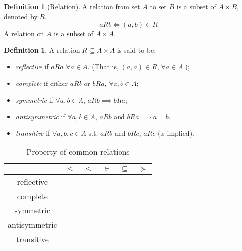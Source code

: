 \documentclass[12pt]{article}
\theoremstyle{definition}
\newtheorem{definition}[theorem]{Definition}
\theoremstyle{plain}
\newcommand{\cmark}{\ding{51}}%
\newcommand{\xmark}{\ding{55}}%
\begin{document}
\begin{definition}
    [Relation]
    A relation from set $A$ to set $B$ is a subset of $A\times B$, denoted by 
    $R$. 
    \[
        a R b \iff (a,b) \in R
    \]
    A relation on $A$ is a subset of $A \times A$.

    \label{def:a_relation_on_A}
\end{definition}

\begin{definition}
    A relation $R \subseteq A \times A$ is said to be: 
    \begin{itemize}
        \item \emph{reflective} if $a R a$ $\forall a \in A$. (That is, $(a,a) \in R 
            $, $\forall a \in A$.);

        \item \emph{complete} if either $aRb$ or $b R a$, $\forall a, b \in A$;

        \item \emph{symmetric} if $\forall a, b \in A$, $aR b \implies b R a$;

        \item \emph{antisymmetric} if $\forall a, b \in A$, $a R b $ and $ b R a 
            \implies a = b$.

        \item \emph{transitive} if $\forall a,b,c \in A$ s.t. $aRb$ and $bRc$, 
            $aRc$ (is implied).
    \end{itemize}
\end{definition}

\begin{table}[htpl]
    \caption{Property of common relations}
    \bigskip
    \centering
    \begin{tabular}{c|c|c|c|c|c}
                        & $<$    & $\le$  & $\in$  & $\subseteq $ & $\succeq$ \\
          \hline
          reflective    & \xmark & \cmark & \xmark & \cmark       & \cmark    \\
          complete      & \xmark & \cmark & \xmark & \xmark       & \cmark    \\
          symmetric     & \xmark & \xmark & \xmark & \xmark       & \xmark    \\
          antisymmetric & \cmark & \cmark & \cmark & \cmark       & \xmark    \\
          transitive    & \cmark & \cmark & \xmark & \cmark       & \cmark
    \end{tabular}
\end{table}
\end{document}
